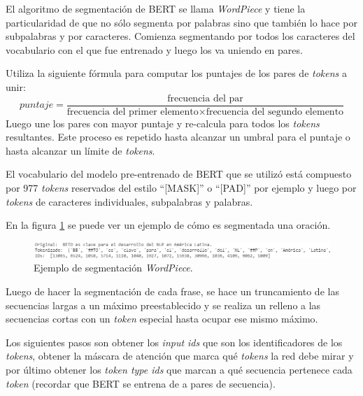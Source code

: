 El algoritmo de segmentación de BERT se llama \textit{WordPiece} y tiene la particularidad de que no sólo segmenta por palabras sino que también lo hace por subpalabras y por caracteres. Comienza segmentando por todos los caracteres del vocabulario con el que fue entrenado y luego los va uniendo en pares. 

Utiliza la siguiente fórmula para computar los puntajes de los pares de \textit{tokens} a unir:
\begin{equation}
puntaje = \frac{\text{frecuencia del par}}{\text{frecuencia del primer elemento}\times \text{frecuencia del segundo elemento}}
\end{equation}
Luego une los pares con mayor puntaje y re-calcula para todos los \textit{tokens} resultantes. Este proceso es repetido hasta alcanzar un umbral para el puntaje o hasta alcanzar un límite de \textit{tokens}.

El vocabulario del modelo pre-entrenado de BERT que se utilizó está compuesto por 977 \textit{tokens} reservados del estilo ``[MASK]'' o ``[PAD]'' por ejemplo y luego por \textit{tokens} de caracteres individuales, subpalabras y palabras. \citep{WEBSITE:22}

En la figura \ref{fig:segmentacion-bert} se puede ver un ejemplo de cómo es segmentada una oración.

\begin{figure}[htbp]
	\centering
	\includegraphics[width=1.05\textwidth]{./Figures/cap3-segmentacion.png}
	\caption{Ejemplo de segmentación \textit{WordPiece}\protect\footnotemark.}
	\label{fig:segmentacion-bert}
\end{figure}


Luego de hacer la segmentación de cada frase, se hace un truncamiento de las secuencias largas a un máximo preestablecido y se realiza un relleno a las secuencias cortas con un \textit{token} especial hasta ocupar ese mismo máximo.

Los siguientes pasos son obtener los \textit{input ids} que son los identificadores de los \textit{tokens}, obtener la máscara de atención que marca qué \textit{tokens} la red debe mirar y por último obtener los \textit{token type ids} que marcan a qué secuencia pertenece cada \textit{token} (recordar que BERT se entrena de a pares de secuencia).

